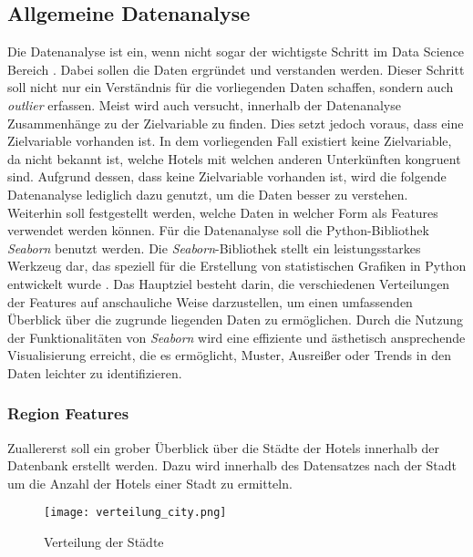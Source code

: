 \subsection{Allgemeine Datenanalyse}
\label{subsec:Datenanalyse}
Die Datenanalyse ist ein, wenn nicht sogar der wichtigste Schritt im Data Science Bereich \cite{Agarwal.05.10.2018}. Dabei sollen die Daten ergründet und verstanden werden. Dieser Schritt soll nicht nur ein Verständnis für die vorliegenden Daten schaffen, sondern auch \emph{outlier} erfassen. Meist wird auch versucht, innerhalb der Datenanalyse Zusammenhänge zu der Zielvariable zu finden. Dies setzt jedoch voraus, dass eine Zielvariable vorhanden ist. In dem vorliegenden Fall existiert keine Zielvariable, da nicht bekannt ist, welche Hotels mit welchen anderen Unterkünften kongruent sind. Aufgrund dessen, dass keine Zielvariable vorhanden ist, wird die folgende Datenanalyse lediglich dazu genutzt, um die Daten besser zu verstehen. Weiterhin soll festgestellt werden, welche Daten in welcher Form als Features verwendet werden können.
\newline
\newline
Für die Datenanalyse soll die Python-Bibliothek \emph{Seaborn} benutzt werden. Die \emph{Seaborn}-Bibliothek stellt ein leistungsstarkes Werkzeug dar, das speziell für die Erstellung von statistischen Grafiken in Python entwickelt wurde \cite{Melanie.2023}. Das Hauptziel besteht darin, die verschiedenen Verteilungen der Features auf anschauliche Weise darzustellen, um einen umfassenden Überblick über die zugrunde liegenden Daten zu ermöglichen. Durch die Nutzung der Funktionalitäten von \emph{Seaborn} wird eine effiziente und ästhetisch ansprechende Visualisierung erreicht, die es ermöglicht, Muster, Ausreißer oder Trends in den Daten leichter zu identifizieren.

\subsubsection{Region Features}
Zuallererst soll ein grober Überblick über die Städte der Hotels innerhalb der Datenbank erstellt werden. Dazu wird innerhalb des Datensatzes nach der Stadt um die Anzahl der Hotels einer Stadt zu ermitteln.

\newpage

\begin{figure}[h]
    \centering
    \texttt{[image: verteilung\_city.png]}
    \caption[Verteilung der Städte]{Verteilung der Städte}
    \label{img:verteilung_city}
\end{figure}

